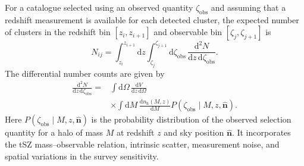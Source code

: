 \documentclass[aps,prd,twocolumn,superscriptaddress,nofootinbib,floatfix]{revtex4-2}
\begin{document}
For a catalogue selected using an observed quantity $\zeta_{\mathrm{obs}}$ and assuming that a redshift measurement is available for each detected cluster, the expected number of clusters in the redshift bin $[z_i,z_{i+1}]$ and observable bin $[\zeta_j,\zeta_{j+1}]$ is
\begin{equation}
    N_{ij}
    =
    \int_{z_i}^{z_{i+1}}
    \mathrm{d}z
    \int_{\zeta_j}^{\zeta_{j+1}}
    \mathrm{d}\zeta_{\mathrm{obs}}\,
    \frac{\mathrm{d}^2N}
    {\mathrm{d}z\,\mathrm{d}\zeta_{\mathrm{obs}}}.
    \label{eq:cluster_counts_binned}
\end{equation}
The differential number counts are given by
\begin{equation}
\begin{aligned}
    \frac{\mathrm{d}^2N}
    {\mathrm{d}z\,\mathrm{d}\zeta_{\mathrm{obs}}}
    ={}&
    \int \mathrm{d}\Omega\,
    \frac{\mathrm{d}V}
    {\mathrm{d}z\,\mathrm{d}\Omega}
    \\
    &\times
    \int \mathrm{d}M\,
    \frac{\mathrm{d}n_{\mathrm{h}}(M,z)}
    {\mathrm{d}M}
    P\left(
        \zeta_{\mathrm{obs}}
        \mid M,z,\hat{\bm{n}}
    \right).
\end{aligned}
\label{eq:cluster_counts_differential}
\end{equation}
Here $P(\zeta_{\mathrm{obs}}\mid M,z,\hat{\bm{n}})$ is the probability distribution of the observed selection quantity for a halo of mass $M$ at redshift $z$ and sky position $\hat{\bm{n}}$. It incorporates the tSZ mass--observable relation, intrinsic scatter, measurement noise, and spatial variations in the survey sensitivity. 
\end{document}
